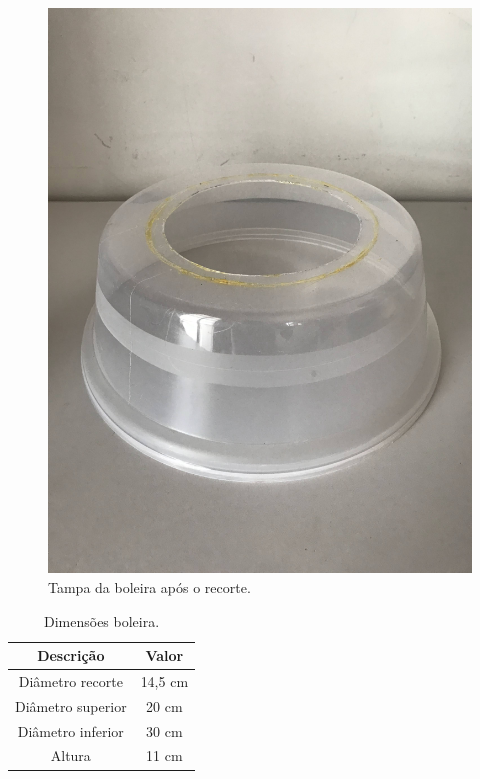 \documentclass[
	12pt,				%
	openright,			%
	oneside,			%
	a4paper,			%
	chapter=TITLE,		%
	english,			%
	brazil				%
	]{abntex2}
\begin{document}
\begin{multicols}{3}
\begin{figure}[H]
    \centering
    \includegraphics[scale=0.04, angle=-90]{imagens/IMG_0603.jpg}
    \caption{Tampa da boleira após o recorte.}
    \label{fig:boleirarecorte}
\end{figure}        

\begin{table}[H]
    \centering
    \caption{Dimensões boleira.}
    \label{tab:boleira} 
    \begin{tabular}{ |c|c| }                           
        \hline
        \rowcolor{lightgray} \textbf{Descrição} & \textbf{Valor} \\
        \hline
        Diâmetro recorte & 14,5 cm \\
        \hline
        Diâmetro superior & 20 cm \\
        \hline
        Diâmetro inferior & 30 cm \\
        \hline
        Altura & 11 cm \\
        \hline
    \end{tabular}  
\end{table}
\end{multicols}
\end{document}
